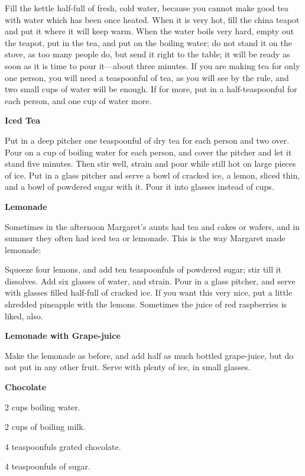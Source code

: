 \documentclass[11pt]{book}
\newcommand{\indpar}{\par\noindent\hspace*{\parindent}}
\newcommand{\ingredient}{\indpar}
\newcommand{\instruction}{\indpar}
\newenvironment{RecipeTitle}{\medskip\begin{center}\large\bf }{\end{center}\smallskip}
\begin{document}
  Fill the kettle half-full of fresh, cold water,
because you cannot make good tea with water which
has been once heated.  When it is very hot, fill the
china teapot and put it where it will keep warm.
When the water boils very hard, empty out the teapot,
put in the tea, and put on the boiling water; do not
stand it on the stove, as too many people do, but send
it right to the table; it will be ready as soon as it is
time to pour it---about three minutes.  If you are
making tea for only one person, you will need a 
teaspoonful of tea, as you will see by the rule,
and two small cups of water will be enough.  If for more,
put in a half-teaspoonful for each person, and one cup of
water more.
\begin{RecipeTitle}
Iced Tea\label{iced_tea}
\end{RecipeTitle}
\instruction
  Put in a deep pitcher one teaspoonful of dry tea
for each person and two over.  Pour on a cup of boiling
water for each person, and cover the pitcher and let
it stand five minutes.  Then stir well, strain and pour
while still hot on large pieces of ice.  Put in a glass
pitcher and serve a bowl of cracked ice, a lemon,
sliced thin, and a bowl of powdered sugar with it.
Pour it into glasses instead of cups.
\begin{RecipeTitle}
Lemonade\label{lemonade}
\end{RecipeTitle}
\instruction
  Sometimes in the afternoon Margaret's aunts had tea
and cakes or wafers, and in summer they often had iced
tea or lemonade.  This is the way Margaret made lemonade:
\instruction
  Squeeze four lemons, and add ten teaspoonfuls of powdered
sugar; stir till it dissolves.  Add six glasses of water,
and strain.  Pour in a glass pitcher, and serve with
glasses filled half-full of cracked ice.  If you want
this very nice, put a little shredded pineapple with
the lemons.  Sometimes the juice of red raspberries
is liked, also.
\begin{RecipeTitle}
Lemonade with Grape-juice\label{lemonade_with_grape_juice}
\end{RecipeTitle}
\instruction
  Make the lemonade as before, and add half as much
bottled grape-juice, but do not put in any other fruit.
Serve with plenty of ice, in small glasses.\pagebreak[4]
\begin{RecipeTitle}
Chocolate\label{chocolate}
\end{RecipeTitle}
\ingredient  2 cups boiling water.
\ingredient  2 cups of boiling milk.
\ingredient  4 teaspoonfuls grated chocolate.
\ingredient  4 teaspoonfuls of sugar.
\end{document}
